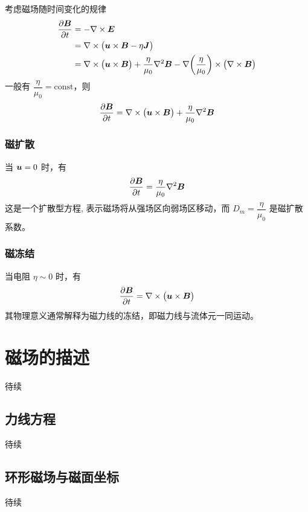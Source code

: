考虑磁场随时间变化的规律
\begin{equation}\begin{aligned}
    \frac{\partial {\bm{B}}}{\partial {t}} &= - \nabla \times {\bm{E}} \\
    &= \nabla \times {\big( \bm{u} \times \bm{B} - \eta \bm{J} \big)} \\
    &= \nabla \times {\big( \bm{u} \times \bm{B} \big)}
    + \frac{\eta}{\mu_0} \nabla^2 {\bm{B}}
    - \nabla {\left(\frac{\eta}{\mu_0}\right)} \times \big(\nabla \times {\bm{B}}\big)
\end{aligned}\end{equation}
一般有 $\dfrac{\eta}{\mu_0} = \text{const}$，则
\begin{equation}
    \frac{\partial {\bm{B}}}{\partial {t}} = \nabla \times {\big( \bm{u} \times \bm{B} \big)}
    + \frac{\eta}{\mu_0} \nabla^2 {\bm{B}}
\end{equation}

\subsubsection{磁扩散}

当 $\bm{u}=0$ 时，有
\begin{equation}
    \frac{\partial {\bm{B}}}{\partial {t}} = \frac{\eta}{\mu_0} \nabla^2 {\bm{B}}
\end{equation}
这是一个扩散型方程, 表示磁场将从强场区向弱场区移动，而 $D_m = \dfrac{\eta}{\mu_0}$ 是磁扩散系数。

\subsubsection{磁冻结}

当电阻 $\eta \sim 0$ 时，有
\begin{equation}
    \frac{\partial {\bm{B}}}{\partial {t}} = \nabla \times {\big( \bm{u} \times \bm{B} \big)}
\end{equation}
其物理意义通常解释为磁力线的冻结，即磁力线与流体元一同运动。

\section{磁场的描述}

待续

\subsection{力线方程}

待续

\subsection{环形磁场与磁面坐标}

待续
